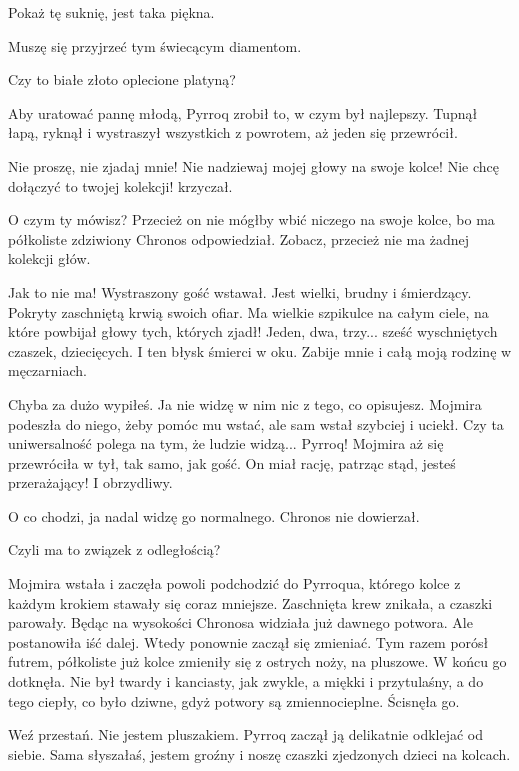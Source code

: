 \ds{} Pokaż tę suknię, jest taka piękna. \de{}

\ds{} Muszę się przyjrzeć tym świecącym diamentom. \de{}

\ds{} Czy to białe złoto oplecione platyną? \de{}

Aby uratować pannę młodą, Pyrroq zrobił to, w czym był najlepszy. Tupnął łapą, ryknął i wystraszył wszystkich z powrotem, aż jeden się przewrócił.

\ds{} Nie proszę, nie zjadaj mnie! Nie nadziewaj mojej głowy na swoje kolce! Nie chcę dołączyć to twojej kolekcji! \dm{} krzyczał. \de{}

\ds{} O czym ty mówisz? Przecież on nie mógłby wbić niczego na swoje kolce, bo ma półkoliste \dm{} zdziwiony Chronos odpowiedział. \dm{}
Zobacz, przecież nie ma żadnej kolekcji głów. \de{}

\ds{} Jak to nie ma! \dm{} Wystraszony gość wstawał. \dm{} Jest wielki, brudny i śmierdzący. Pokryty zaschniętą krwią swoich ofiar.
Ma wielkie szpikulce na całym ciele, na które powbijał głowy tych, których zjadł! Jeden, dwa, trzy... sześć wyschniętych czaszek, dziecięcych.
I ten błysk śmierci w oku. Zabije mnie i całą moją rodzinę w męczarniach. \de{}

\ds{} Chyba za dużo wypiłeś. Ja nie widzę w nim nic z tego, co opisujesz. \dm{} Mojmira podeszła do niego, żeby pomóc mu wstać, ale sam wstał szybciej i uciekł. \dm{}
Czy ta uniwersalność polega na tym, że ludzie widzą... Pyrroq! \dm{} Mojmira aż się przewróciła w tył, tak samo, jak gość. \dm{} On miał rację, patrząc stąd, jesteś przerażający! I obrzydliwy. \de{}

\ds{} O co chodzi, ja nadal widzę go normalnego. \dm{} Chronos nie dowierzał. \de{}

\ds{} Czyli ma to związek z odległością? \de{}

Mojmira wstała i zaczęła powoli podchodzić do Pyrroqua, którego kolce z każdym krokiem stawały się coraz mniejsze. Zaschnięta krew znikała, a czaszki parowały. 
Będąc na wysokości Chronosa widziała już dawnego potwora.
Ale postanowiła iść dalej. Wtedy ponownie zaczął się zmieniać.
Tym razem porósł futrem, półkoliste już kolce zmieniły się z ostrych noży, na pluszowe.
W końcu go dotknęła.
Nie był twardy i kanciasty, jak zwykle, a miękki i przytulaśny, a do tego ciepły, co było dziwne, gdyż potwory są zmiennocieplne.
Ścisnęła go.

\ds{} Weź przestań. Nie jestem pluszakiem. \dm{} Pyrroq zaczął ją delikatnie odklejać od siebie. \dm{}
Sama słyszałaś, jestem groźny i noszę czaszki zjedzonych dzieci na kolcach. \de{}

